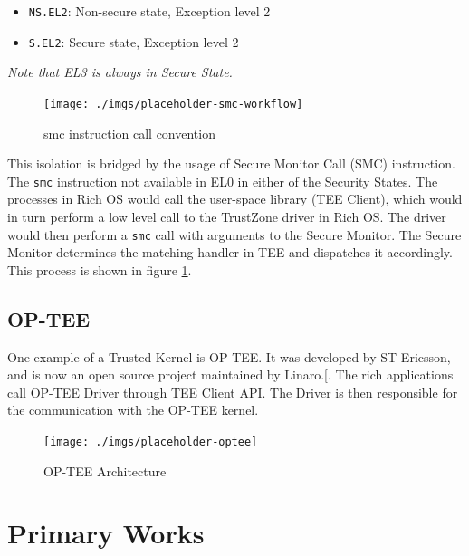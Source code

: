 \documentclass[a4paper, nobind]{templates/ociamthesis}
\providecommand{\tightlist}{%
  \setlength{\itemsep}{0pt}\setlength{\parskip}{0pt}}
\begin{document}
\begin{itemize}
\tightlist
\item
  \texttt{NS.EL2}: Non-secure state, Exception level 2
\item
  \texttt{S.EL2}: Secure state, Exception level 2
\end{itemize}

\emph{Note that EL3 is always in Secure State.}

\begin{figure}[H]

{\centering \texttt{[image: ./imgs/placeholder-smc-workflow]} 

}

\caption{smc instruction call convention}\label{fig:smc-convention}
\end{figure}

This isolation is bridged by the usage of Secure Monitor Call (SMC) instruction.
The \texttt{smc} instruction not available in EL0 in either of the Security States.
The processes in Rich OS would call the user-space library (TEE Client),
which would in turn perform a low level call to the TrustZone driver in Rich OS.
The driver would then perform a \texttt{smc} call with arguments to the Secure Monitor.
The Secure Monitor determines the matching handler in TEE and dispatches it accordingly.
This process is shown in figure \ref{fig:smc-convention}.

\subsection{OP-TEE}\label{op-tee}

One example of a Trusted Kernel is OP-TEE. It was developed by ST-Ericsson,
and is now an open source project maintained by Linaro.{[}\citeproc{ref-optee}{18}{]}.
The rich applications call OP-TEE Driver through TEE Client API. The Driver
is then responsible for the communication with the OP-TEE kernel.

\begin{figure}[H]

{\centering \texttt{[image: ./imgs/placeholder-optee]} 

}

\caption{OP-TEE Architecture}\label{fig:optee-arch}
\end{figure}

\section{Primary Works}\label{primary-works}
\end{document}
